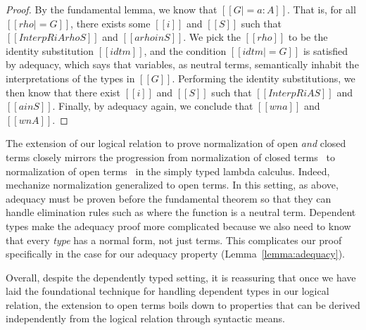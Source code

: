 \documentclass[\ifpublic nolinenum\else\fi,online,OA]{jfp}
\theoremstyle{definition}
\begin{document}
\begin{proof}
  By the fundamental lemma, we know that $[[G |= a : A]]$. That is,
  for all $[[rho |= G]]$, there exists some $[[i]]$ and $[[S]]$ such
  that $[[InterpR i A {rho} S]]$ and $[[a {rho} in S]]$.
  We pick the $[[rho]]$ to be the identity substitution $[[idtm]]$, and the
  condition $[[idtm |= G]]$ is satisfied by adequacy, which says that variables,
  as neutral terms, semantically inhabit the interpretations of the types in
  $[[G]]$. Performing the identity substitutions, we then know that there exist
  $[[i]]$ and $[[S]]$ such that $[[InterpR i A S]]$ and $[[a in S]]$. Finally,
  by adequacy again, we conclude that $[[wn a]]$ and $[[wn A]]$.
\end{proof}


The extension of our logical relation to prove normalization of open
\emph{and} closed terms closely mirrors the progression from
normalization of closed terms~\citep{harpertait} to normalization of
open terms~\citep{harperkripke} in the simply typed lambda calculus.
Indeed, \citet{abel2019poplmark} mechanize normalization generalized
to open terms. In this setting, as above,
adequacy must be proven before the
fundamental theorem so that they can handle elimination rules such as
 where the function is a neutral term. %
%
Dependent types make the adequacy proof more complicated because we
also need to know that every \emph{type} has a normal form, not just
terms. This complicates our proof specifically in the  case for
our adequacy property (Lemma~\ref{lemma:adequacy}).

Overall, despite the dependently typed setting, it is reassuring that
once we have laid the foundational technique for handling dependent types in
our logical relation, the extension to open terms boils down to
properties that can be derived independently from the logical relation through
syntactic means.
\end{document}

